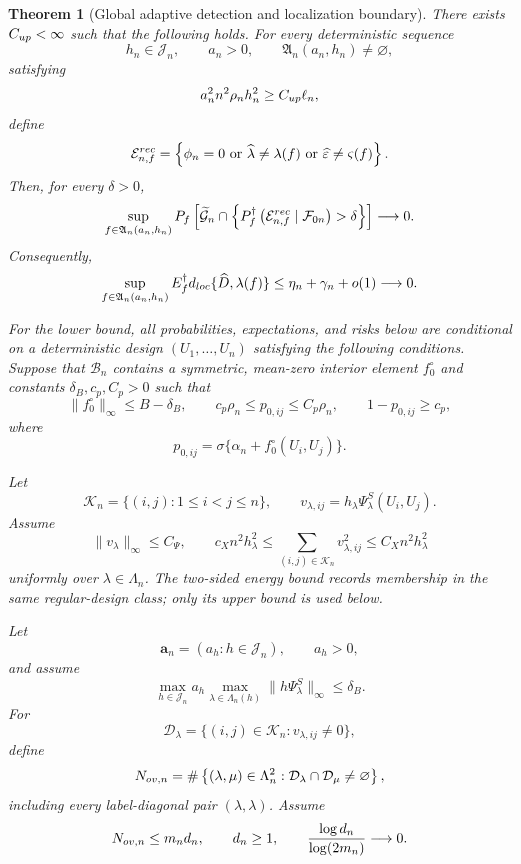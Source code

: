 \documentclass[10pt,a4paper]{amsart}
\newtheorem{theorem}{Theorem}
\begin{document}
\begin{theorem}[Global adaptive detection and localization boundary]
There exists \(C_{\rm up}<\infty\) such that the following holds.
For every deterministic sequence
\[
h_n\in\mathcal J_n,
\qquad
a_n>0,
\qquad
\mathfrak A_n(a_n,h_n)\ne\varnothing,
\]
satisfying
\begin{equation}
a_n^2n^2\rho_nh_n^2
\ge
C_{\rm up}\ell_n,
\label{eq:t3-17}
\end{equation}
define
\[
\mathcal E_{n,f}^{\rm rec}
=
\left\{
\phi_n=0
\ \text{or}\
\widehat\lambda\ne\lambda(f)
\ \text{or}\
\widehat\varepsilon\ne\varsigma(f)
\right\}.
\]
Then, for every \(\delta>0\),
\begin{equation}
\sup_{f\in\mathfrak A_n(a_n,h_n)}
P_f\left[
\widetilde{\mathcal G}_n
\cap
\left\{
P_f^\dagger
\left(
\mathcal E_{n,f}^{\rm rec}
\mid\mathcal F_{0n}
\right)
>\delta
\right\}
\right]
\longrightarrow0.
\label{eq:t3-18}
\end{equation}
Consequently,
\begin{equation}
\sup_{f\in\mathfrak A_n(a_n,h_n)}
E_f^\dagger
d_{\rm loc}\{\widehat D,\lambda(f)\}
\le
\eta_n+\gamma_n+o(1)
\longrightarrow0.
\label{eq:t3-19}
\end{equation}

For the lower bound, all probabilities, expectations, and risks below
are conditional on a deterministic design
\((U_1,\ldots,U_n)\) satisfying the following conditions.  Suppose
that \(\mathcal B_n\) contains a symmetric, mean-zero interior
element \(f_0^\circ\) and constants \(\delta_B,c_p,C_p>0\) such that
\begin{equation}
\|f_0^\circ\|_\infty\le B-\delta_B,
\qquad
c_p\rho_n\le p_{0,ij}\le C_p\rho_n,
\qquad
1-p_{0,ij}\ge c_p,
\label{eq:t3-20}
\end{equation}
where
\[
p_{0,ij}
=
\sigma\{\alpha_n+f_0^\circ(U_i,U_j)\}.
\]

Let
\[
\mathcal K_n
=
\{(i,j):1\le i<j\le n\},
\qquad
v_{\lambda,ij}
=
h_\lambda\Psi_\lambda^S(U_i,U_j).
\]
Assume
\begin{equation}
\|v_\lambda\|_\infty\le C_\Psi,
\qquad
c_Xn^2h_\lambda^2
\le
\sum_{(i,j)\in\mathcal K_n}v_{\lambda,ij}^2
\le
C_Xn^2h_\lambda^2
\label{eq:t3-21}
\end{equation}
uniformly over \(\lambda\in\Lambda_n\).  The two-sided energy
bound records membership in the same regular-design class; only its
upper bound is used below.

Let
\[
\mathbf a_n=(a_h:h\in\mathcal J_n),
\qquad
a_h>0,
\]
and assume
\begin{equation}
\max_{h\in\mathcal J_n}
a_h
\max_{\lambda\in\Lambda_n(h)}
\|h\Psi_\lambda^S\|_\infty
\le\delta_B.
\label{eq:t3-22}
\end{equation}
For
\[
\mathcal D_\lambda
=
\{(i,j)\in\mathcal K_n:v_{\lambda,ij}\ne0\},
\]
define
\[
N_{{\rm ov},n}
=
\#\left\{
(\lambda,\mu)\in\Lambda_n^2:
\mathcal D_\lambda\cap\mathcal D_\mu\ne\varnothing
\right\},
\]
including every label-diagonal pair \((\lambda,\lambda)\).  Assume
\begin{equation}
N_{{\rm ov},n}
\le m_nd_n,
\qquad
d_n\ge1,
\qquad
\frac{\log d_n}{\log(2m_n)}
\longrightarrow0.
\label{eq:t3-23}
\end{equation}


\end{theorem}
\end{document}
